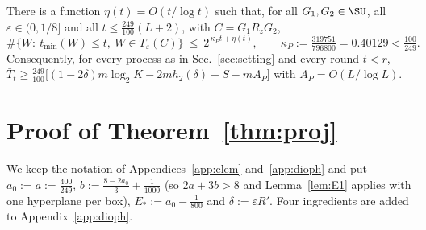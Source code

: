 
\begin{theorem}\label{thm:proj}
There is a function $\eta(t)=O(t/\log t)$ such that, for all $G_1,G_2\in\SU$, all $\varepsilon\in(0,1/8]$ and all
$t\le\tfrac{249}{100}(L+2)$, with $C=G_1R_zG_2$,
\[
\#\{W:\ t_{\min}(W)\le t,\ W\in T_\varepsilon(C)\}\ \le\ 2^{\,\kappa_Pt+\eta(t)},\qquad
\kappa_P:=\tfrac{319751}{796800}=0.40129<\tfrac{100}{249}.
\]
Consequently, for every process as in Sec.~\ref{sec:setting} and every round $t<r$,
$\bar T_t\ge\tfrac{249}{100}\big[(1-2\delta)m\log_2K-2mh_2(\delta)-S-mA_P\big]$ with $A_P=O(L/\log L)$.
\end{theorem}

\section{Proof of Theorem~\ref{thm:proj}}\label{app:proj}

We keep the notation of Appendices~\ref{app:elem} and~\ref{app:dioph} and put $a_0:=a:=\tfrac{400}{249}$,
$b:=\tfrac{8-2a_0}3+\tfrac1{1000}$ (so $2a+3b>8$ and Lemma~\ref{lem:E1} applies with one hyperplane per box),
$E_*:=a_0-\tfrac1{800}$ and $\delta:=\varepsilon R'$. Four ingredients are added to Appendix~\ref{app:dioph}.


